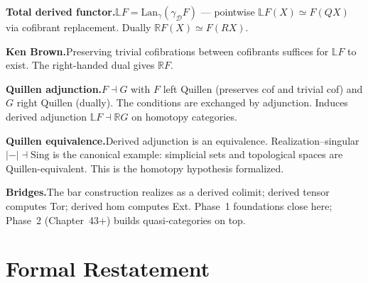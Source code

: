 \begin{summarybox}
\textbf{Total derived functor.}\quad $\mathbb{L}F = \mathrm{Lan}_\gamma
(\gamma_{\mathcal{D}} F)$ — pointwise $\mathbb{L}F(X) \simeq F(QX)$ via
cofibrant replacement. Dually $\mathbb{R}F(X) \simeq F(RX)$.

\textbf{Ken Brown.}\quad Preserving trivial cofibrations between
cofibrants suffices for $\mathbb{L}F$ to exist. The right-handed dual
gives $\mathbb{R}F$.

\textbf{Quillen adjunction.}\quad $F \dashv G$ with $F$ left Quillen
(preserves cof and trivial cof) and $G$ right Quillen (dually). The
conditions are exchanged by adjunction. Induces derived adjunction
$\mathbb{L}F \dashv \mathbb{R}G$ on homotopy categories.

\textbf{Quillen equivalence.}\quad Derived adjunction is an equivalence.
Realization–singular $\lvert{-}\rvert \dashv \mathrm{Sing}$ is the
canonical example: simplicial sets and topological spaces are
Quillen-equivalent. This is the homotopy hypothesis formalized.

\textbf{Bridges.}\quad The bar construction realizes as a derived
colimit; derived tensor computes Tor; derived hom computes Ext. Phase~1
foundations close here; Phase~2 (Chapter~43+) builds quasi-categories
on top.
\end{summarybox}


\section*{Formal Restatement}

